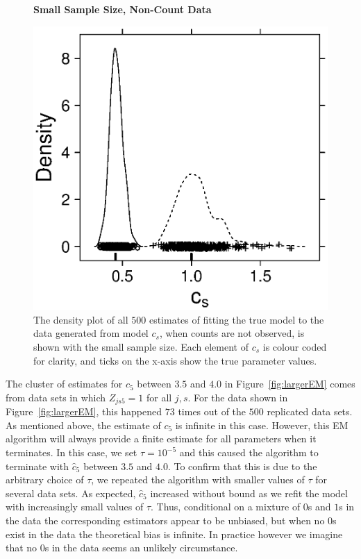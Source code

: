 \documentclass[smallextended]{svjour3}
\begin{document}
\begin{figure}
  \textbf{Small Sample Size, Non-Count Data}\par
  \centering
  \includegraphics[scale=0.75]{smallEM}
  \caption{The density plot of all $500$ estimates of fitting the true model to the data generated from model $c_s$, when counts are not observed, is shown with the small sample size.  Each element of $c_s$ is colour coded for clarity, and ticks on the x-axis show the true parameter values.}
  \label{fig:smallEM}
\end{figure}

The cluster of estimates for $c_5$ between $3.5$ and $4.0$ in Figure~\ref{fig:largerEM} comes from data sets in which $Z_{js5}=1$ for all $j,s$.  For the data shown in Figure~\ref{fig:largerEM}, this happened $73$ times out of the $500$ replicated data sets.  As mentioned above, the estimate of $c_5$ is infinite in this case.  However, this EM algorithm will always provide a finite estimate for all parameters when it terminates.  In this case, we set $\tau=10^{-5}$ and this caused the algorithm to terminate with $\hat c_5$ between $3.5$ and $4.0$.  To confirm that this is due to the arbitrary choice of $\tau$, we repeated the algorithm with smaller values of $\tau$ for several data sets. As expected, $\hat c_5$ increased without bound as we refit the model with increasingly small values of $\tau$.  Thus, conditional on a mixture of $0$s and $1$s in the data the corresponding estimators appear to be unbiased, but when no $0$s exist in the data the theoretical bias is infinite.  In practice however we imagine that no $0$s in the data seems an unlikely circumstance.
\end{document}
